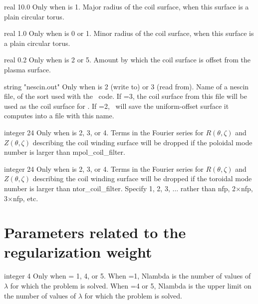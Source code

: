 \myhrule

{real}
{10.0}
{Only when  is 1.}
{Major radius of the coil surface, when this surface is a plain circular torus.}

\myhrule

{real}
{1.0}
{Only when  is 0 or 1.}
{Minor radius of the coil surface, when this surface is a plain circular torus.}


\myhrule

{real}
{0.2}
{Only when  is 2 or 5.}
{Amount by which the coil surface is offset from the plasma surface.}

\myhrule

{string}
{{\ttfamily "nescin.out"}}
{Only when  is 2 (write to) or 3 (read from).}
{Name of a {\ttfamily nescin} file, of the sort used with the \nescoil~code.
If =3, the coil surface from
this file will be used as the coil surface for \regcoil. 
If =2, \regcoil~will save the uniform-offset surface it computes
into a file with this name.}

\myhrule

{integer}
{24}
{Only when  is 2, 3, or 4.}
{Terms in the Fourier series for $R(\theta,\zeta)$ and $Z(\theta,\zeta)$ describing the coil winding surface will be dropped if the poloidal mode number is larger than {\ttfamily mpol\_coil\_filter}.}

\myhrule

{integer}
{24}
{Only when  is 2, 3, or 4.}
{Terms in the Fourier series for $R(\theta,\zeta)$ and $Z(\theta,\zeta)$ describing the coil winding surface will be dropped if the toroidal mode number is larger than {\ttfamily ntor\_coil\_filter}. Specify 1, 2, 3, $\ldots$ rather than {\ttfamily nfp}, 2$\times${\ttfamily nfp}, 3$\times${\ttfamily nfp}, etc.}


\section{Parameters related to the regularization weight}

{integer}
{4}
{Only when  = 1, 4, or 5.}
{When =1, {\ttfamily Nlambda} is the number of values of $\lambda$ for which the problem is solved.
When =4 or 5, {\ttfamily Nlambda} is the upper limit on the number of values of $\lambda$ for which the problem is solved.}

